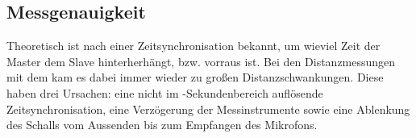 \subsection{Messgenauigkeit}
Theoretisch ist nach einer Zeitsynchronisation bekannt, um wieviel Zeit der Master dem Slave hinterherhängt, bzw. vorraus ist. Bei den Distanzmessungen mit dem \board \platz kam es dabei immer wieder zu großen Distanzschwankungen. Diese haben drei Ursachen: eine nicht im \si{\mu}-Sekundenbereich auflösende Zeitsynchronisation, eine Verzögerung der Messinstrumente sowie eine Ablenkung des Schalls vom Aussenden bis zum Empfangen des Mikrofons.
